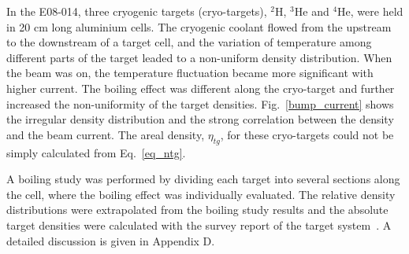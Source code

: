  In the E08-014, three cryogenic targets (cryo-targets), $\mathrm{^{2}H}$, $\mathrm{^{3}He}$ and $\mathrm{^{4}He}$, were held in 20 cm long aluminium cells. The cryogenic coolant flowed from the upstream to the downstream of a target cell, and the variation of temperature among different parts of the target leaded to a non-uniform density distribution. When the beam was on, the temperature fluctuation became more significant with higher current. The boiling effect was different along the cryo-target and further increased the non-uniformity of the target densities. Fig.~\ref{bump_current} shows the irregular density distribution and the strong correlation between the density and the beam current. The areal density, $\eta_{tg}$, for these cryo-targets could not be simply calculated from Eq.~\eqref{eq_ntg}.

  A boiling study was performed by dividing each target into several sections along the cell, where the boiling effect was individually evaluated. The relative density distributions were extrapolated from the boiling study results and the absolute target densities were calculated with the survey report of the target system~\cite{target_report}. A detailed discussion is given in Appendix D. 
 
